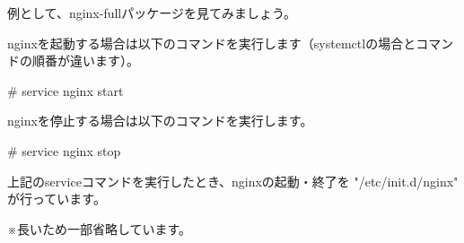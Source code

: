 \documentclass[mingoth,a4paper]{jsarticle}
\begin{document}
例として、nginx-fullパッケージを見てみましょう。


nginxを起動する場合は以下のコマンドを実行します（systemctlの場合とコマンドの順番が違います）。

\begin{commandline}
# service nginx start
\end{commandline}

nginxを停止する場合は以下のコマンドを実行します。

\begin{commandline}
# service nginx stop
\end{commandline}


上記のserviceコマンドを実行したとき、nginxの起動・終了を "/etc/init.d/nginx" が行っています。

※長いため一部省略しています。
\end{document}
